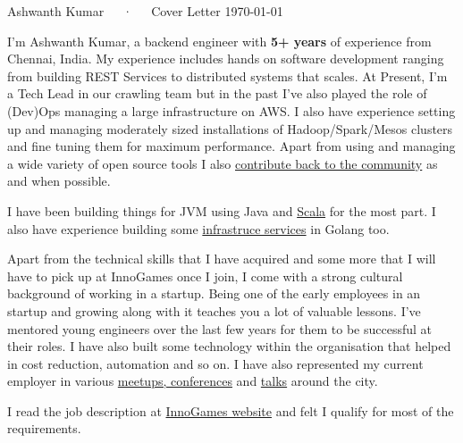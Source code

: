 \documentclass[11pt, a4paper]{awesome-cv}
\begin{document}
\makecvheader

\makecvfooter
  {}
  {Ashwanth Kumar~~~·~~~Cover Letter}
  {\today}

\makelettertitle

\begin{cvletter}

I'm Ashwanth Kumar, a backend engineer with \textbf{5+ years} of experience from Chennai, India. My experience includes hands on software development ranging from building REST Services to distributed systems that scales. At Present, I'm a Tech Lead in our crawling team but in the past I've also played the role of (Dev)Ops managing a large infrastructure on AWS. I also have experience setting up and managing moderately sized installations of Hadoop/Spark/Mesos clusters and fine tuning them for maximum performance. Apart from using and managing a wide variety of open source tools I also \href{https://github.com/ashwanthkumar}{contribute back to the community} as and when possible.

I have been building things for JVM using Java and \href{https://git.io/vQgx5}{Scala} for the most part. I also have experience building some \href{https://github.com/ashwanthkumar/gotlb}{infrastruce services} in Golang too.

Apart from the technical skills that I have acquired and some more that I will have to pick up at InnoGames once I join, I come with a strong cultural background of working in a startup. Being one of the early employees in an startup and growing along with it teaches you a lot of valuable lessons. I've mentored young engineers over the last few years for them to be successful at their roles. I have also built some technology within the organisation that helped in cost reduction, automation and so on. I have also represented my current employer in various \href{https://speakerdeck.com/ashwanthkumar/}{meetups, conferences} and \href{https://www.youtube.com/playlist?list=PLyMKpkdEV2csQg93bEPv2R27sawxIm9zG}{talks} around the city.

\begin{cvparagraph}
I read the job description at \href{https://www.innogames.com/career/open-positions/detail/job/senior-scala-developer-backend-warlords/}{InnoGames website} and felt I qualify for most of the requirements.
\end{cvparagraph}


\end{cvletter}
\end{document}
